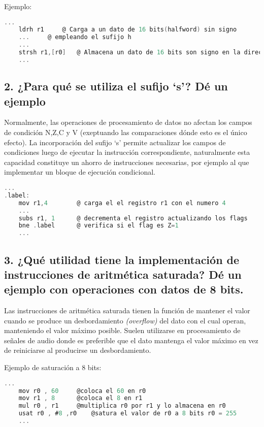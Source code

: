 \documentclass[10pt,a4paper,twoside,spanish]{article}	%
\begin{document}
Ejemplo:
\begin{lstlisting}[language=C]
	...
	ldrh r1		@ Carga a un dato de 16 bits(halfword) sin signo 
	...		@ empleando el sufijo h 
	...
	strsh r1,[r0]	@ Almacena un dato de 16 bits son signo en la direccion r0	
	...
\end{lstlisting}




\subsection*{2. ¿Para qué se utiliza el sufijo ‘s’? Dé un ejemplo}

Normalmente, las operaciones de procesamiento de datos no afectan los campos de condición N,Z,C y V  (exeptuando las comparaciones dónde esto es el único efecto). La incorporación del sufijo ‘s’ permite actualizar los campos de condiciones luego de ejecutar la instrucción correspondiente, naturalmente esta capacidad constituye un ahorro de instrucciones necesarias, por ejemplo al que implementar un bloque de ejecución condicional.

\begin{lstlisting}[language=C]
	...
.label:
	mov r1,4		@ carga el el registro r1 con el numero 4 
	...	
	subs r1, 1		@ decrementa el registro actualizando los flags			
	bne .label		@ verifica si el flag es Z=1
	...
\end{lstlisting}


\subsection*{3. ¿Qué utilidad tiene la implementación de instrucciones de aritmética saturada? Dé un ejemplo con operaciones con datos de 8 bits.}

Las instrucciones de aritmética saturada tienen la función de mantener el valor cuando se produce un desbordamiento \textit{(overflow)} del dato con el cual operan, manteniendo el valor máximo posible. Suelen utilizarse en procesamiento de señales de audio donde es preferible que el dato mantenga el valor máximo en vez de reiniciarse al producirse un desbordamiento.

Ejemplo de saturación a 8 bits:

\begin{lstlisting}[language=C]
	...
	mov r0 , 60		@coloca el 60 en r0 
	mov r1 , 8		@coloca el 8 en r1
	mul r0 , r1		@multiplica r0 por r1 y lo almacena en r0
	usat r0 , #8 ,r0	@satura el valor de r0 a 8 bits r0 = 255	
	...
\end{lstlisting}
\end{document}
